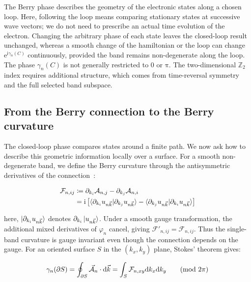 The Berry phase describes the geometry of the electronic states along a chosen loop.
Here, following the loop means comparing stationary states at successive wave vectors;
we do not need to prescribe an actual time evolution of the electron.
Changing the arbitrary phase of each state leaves the closed-loop result unchanged,
whereas a smooth change of the hamiltonian or the loop can change $\mathrm{e}^{\mathrm{i}\gamma_n(C)}$ continuously,
provided the band remains non-degenerate along the loop.
The phase $\gamma_n(C)$ is not generally restricted to $0$ or $\mathrm{\pi}$.
The two-dimensional $\mathbb{Z}_2$ index requires additional structure, which comes from time-reversal symmetry and the full selected band subspace.

\FloatBarrier
\subsection{From the Berry connection to the Berry curvature}
\label{subsec:berry_curvature_appendix}

The closed-loop phase compares states around a finite path.
We now ask how to describe this geometric information locally over a surface.
For a smooth non-degenerate band, we define the Berry curvature through the antisymmetric derivatives of the connection~\cite{xiao2010berry}:

\begin{equation}
\begin{aligned}
    \mathcal{F}_{n,ij}
    &\coloneqq\partial_{k_i}\mathcal{A}_{n,j}
    -\partial_{k_j}\mathcal{A}_{n,i} \\
    &=\mathrm{i}\left[
    \braket{\partial_{k_i}u_{n\vec{k}}|\partial_{k_j}u_{n\vec{k}}}
    -\braket{\partial_{k_j}u_{n\vec{k}}|\partial_{k_i}u_{n\vec{k}}}
    \right]
\end{aligned}
\label{abelian_berry_curvature_appendix}
\end{equation}

here, $\ket{\partial_{k_i}u_{n\vec{k}}}$ denotes $\partial_{k_i}\ket{u_{n\vec{k}}}$.
Under a smooth gauge transformation, the additional mixed derivatives of $\varphi_n$ cancel, giving $\mathcal{F}'_{n,ij}=\mathcal{F}_{n,ij}$.
Thus the single-band curvature is gauge invariant even though the connection depends on the gauge.
For an oriented surface $S$ in the $(k_x,k_y)$ plane, Stokes' theorem gives:

\begin{equation}
    \gamma_n(\partial S)
    =\oint_{\partial S}\vec{\mathcal{A}}_n\cdot\mathrm{d}\vec{k}
    =\int_S\mathcal{F}_{n,xy}\mathrm{d} k_x\mathrm{d} k_y
    \qquad (\mathrm{mod}\ 2\mathrm{\pi})
\label{berry_curvature_stokes_appendix}
\end{equation}

